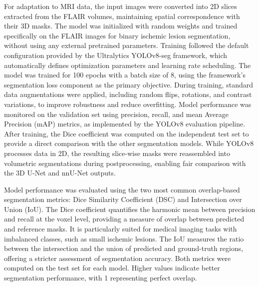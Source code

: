 \documentclass[12pt]{article}
\begin{document}
For adaptation to MRI data, the input images were converted into 2D slices extracted from the FLAIR volumes, maintaining spatial correspondence with their 3D masks. The model was initialized with random weights and trained specifically on the FLAIR images for binary ischemic lesion segmentation, without using any external pretrained parameters.
%
Training followed the default configuration provided by the Ultralytics YOLOv8-seg framework, which automatically defines optimization parameters and learning rate scheduling. The model was trained for 100 epochs with a batch size of 8, using the framework’s segmentation loss component as the primary objective.
%
During training, standard data augmentations were applied, including random flips, rotations, and contrast variations, to improve robustness and reduce overfitting.
%
Model performance was monitored on the validation set using precision, recall, and mean Average Precision (mAP) metrics, as implemented by the YOLOv8 evaluation pipeline.
%
After training, the Dice coefficient was computed on the independent test set to provide a direct comparison with the other segmentation models.
%
While YOLOv8 processes data in 2D, the resulting slice-wise masks were reassembled into volumetric segmentations during postprocessing, enabling fair comparison with the 3D U-Net and nnU-Net outputs.


Model performance was evaluated using the two most common overlap-based segmentation metrics: Dice Similarity Coefficient (DSC) and Intersection over Union (IoU).
%
The Dice coefficient quantifies the harmonic mean between precision and recall at the voxel level, providing a measure of overlap between predicted and reference masks. It is particularly suited for medical imaging tasks with imbalanced classes, such as small ischemic lesions. The IoU measures the ratio between the intersection and the union of predicted and ground-truth regions, offering a stricter assessment of segmentation accuracy.
%
Both metrics were computed on the test set for each model. Higher values indicate better segmentation performance, with 1 representing perfect overlap.

\end{document}

